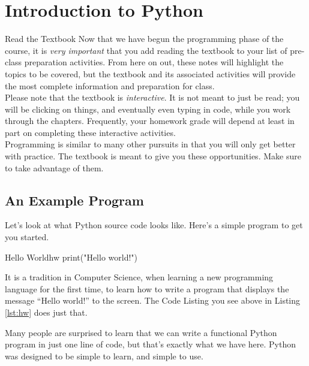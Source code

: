 
\setcounter{chapter}{10}
\chapter{Introduction to Python}
\label{day:python1}


\minitoc

\begin{note}{Read the Textbook}
Now that we have begun the programming phase of the course, it is \textit{very important} that you add reading the textbook to your list of pre-class preparation activities.  From here on out, these notes will highlight the topics to be covered, but the textbook and its associated activities will provide the most complete information and preparation for class.\\

Please note that the textbook is \textit{interactive}.  It is not meant to just be read; you will be clicking on things, and eventually even typing in code, while you work through the chapters.  Frequently, your homework grade will depend at least in part on completing these interactive activities.\\

Programming is similar to many other pursuits in that you will only get better with practice.  The textbook is meant to give you these opportunities.  Make sure to take advantage of them.
\end{note}

\section{An Example Program}

Let's look at what Python source code looks like.  Here's a simple program to get you started.

\begin{py}{Hello World}{hw}
print("Hello world!")
\end{py}

It is a tradition in Computer Science, when learning a new programming language for the first time, to learn how to write a program that displays the message ``Hello world!'' to the screen.  The Code Listing you see above in Listing \ref{lst:hw} does just that.

Many people are surprised to learn that we can write a functional Python program in just one line of code, but that's exactly what we have here.  Python was designed to be simple to learn, and simple to use.

